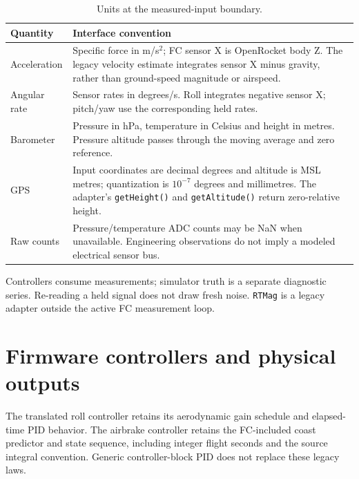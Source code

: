 \documentclass[10pt,letterpaper]{article}
\newcommand{\code}[1]{\nolinkurl{#1}}
\newcommand{\class}[1]{\nolinkurl{#1}}
\begin{document}
\begin{table}[htbp]\centering\small
\begin{tabularx}{\linewidth}{@{}p{2.4cm}Y@{}}\toprule
Quantity & Interface convention\\\midrule
Acceleration & Specific force in m/s\(^2\); FC sensor X is OpenRocket body Z. The legacy velocity estimate integrates sensor X minus gravity, rather than ground-speed magnitude or airspeed.\\
Angular rate & Sensor rates in degrees/s. Roll integrates negative sensor X; pitch/yaw use the corresponding held rates.\\
Barometer & Pressure in hPa, temperature in Celsius and height in metres. Pressure altitude passes through the moving average and zero reference.\\
GPS & Input coordinates are decimal degrees and altitude is MSL metres; quantization is \(10^{-7}\) degrees and millimetres. The adapter's \code{getHeight()} and \code{getAltitude()} return zero-relative height.\\
Raw counts & Pressure/temperature ADC counts may be NaN when unavailable. Engineering observations do not imply a modeled electrical sensor bus.\\
\bottomrule\end{tabularx}
\caption{Units at the measured-input boundary.}
\end{table}
Controllers consume measurements; simulator truth is a separate diagnostic
series. Re-reading a held signal does not draw fresh noise. \class{RTMag}
is a legacy adapter outside the active FC measurement loop.

\clearpage
\section{Firmware controllers and physical outputs}
The translated roll controller retains its aerodynamic gain schedule and
elapsed-time PID behavior. The airbrake controller retains the FC-included
coast predictor and state sequence, including integer flight seconds and the
source integral convention. Generic controller-block PID does not replace
these legacy laws.
\end{document}
